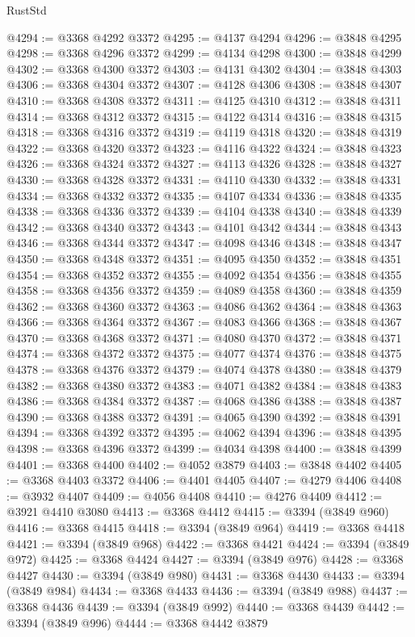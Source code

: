 \begin{lexlean}{RustStd}
\begin{coremodule}
@4294 := @3368 @4292 @3372
@4295 := @4137 @4294
@4296 := @3848 @4295
@4298 := @3368 @4296 @3372
@4299 := @4134 @4298
@4300 := @3848 @4299
@4302 := @3368 @4300 @3372
@4303 := @4131 @4302
@4304 := @3848 @4303
@4306 := @3368 @4304 @3372
@4307 := @4128 @4306
@4308 := @3848 @4307
@4310 := @3368 @4308 @3372
@4311 := @4125 @4310
@4312 := @3848 @4311
@4314 := @3368 @4312 @3372
@4315 := @4122 @4314
@4316 := @3848 @4315
@4318 := @3368 @4316 @3372
@4319 := @4119 @4318
@4320 := @3848 @4319
@4322 := @3368 @4320 @3372
@4323 := @4116 @4322
@4324 := @3848 @4323
@4326 := @3368 @4324 @3372
@4327 := @4113 @4326
@4328 := @3848 @4327
@4330 := @3368 @4328 @3372
@4331 := @4110 @4330
@4332 := @3848 @4331
@4334 := @3368 @4332 @3372
@4335 := @4107 @4334
@4336 := @3848 @4335
@4338 := @3368 @4336 @3372
@4339 := @4104 @4338
@4340 := @3848 @4339
@4342 := @3368 @4340 @3372
@4343 := @4101 @4342
@4344 := @3848 @4343
@4346 := @3368 @4344 @3372
@4347 := @4098 @4346
@4348 := @3848 @4347
@4350 := @3368 @4348 @3372
@4351 := @4095 @4350
@4352 := @3848 @4351
@4354 := @3368 @4352 @3372
@4355 := @4092 @4354
@4356 := @3848 @4355
@4358 := @3368 @4356 @3372
@4359 := @4089 @4358
@4360 := @3848 @4359
@4362 := @3368 @4360 @3372
@4363 := @4086 @4362
@4364 := @3848 @4363
@4366 := @3368 @4364 @3372
@4367 := @4083 @4366
@4368 := @3848 @4367
@4370 := @3368 @4368 @3372
@4371 := @4080 @4370
@4372 := @3848 @4371
@4374 := @3368 @4372 @3372
@4375 := @4077 @4374
@4376 := @3848 @4375
@4378 := @3368 @4376 @3372
@4379 := @4074 @4378
@4380 := @3848 @4379
@4382 := @3368 @4380 @3372
@4383 := @4071 @4382
@4384 := @3848 @4383
@4386 := @3368 @4384 @3372
@4387 := @4068 @4386
@4388 := @3848 @4387
@4390 := @3368 @4388 @3372
@4391 := @4065 @4390
@4392 := @3848 @4391
@4394 := @3368 @4392 @3372
@4395 := @4062 @4394
@4396 := @3848 @4395
@4398 := @3368 @4396 @3372
@4399 := @4034 @4398
@4400 := @3848 @4399
@4401 := @3368 @4400
@4402 := @4052 @3879
@4403 := @3848 @4402
@4405 := @3368 @4403 @3372
@4406 := @4401 @4405
@4407 := @4279 @4406
@4408 := @3932 @4407
@4409 := @4056 @4408
@4410 := @4276 @4409
@4412 := @3921 @4410 @3080
@4413 := @3368 @4412
@4415 := @3394 (@3849 @960)
@4416 := @3368 @4415
@4418 := @3394 (@3849 @964)
@4419 := @3368 @4418
@4421 := @3394 (@3849 @968)
@4422 := @3368 @4421
@4424 := @3394 (@3849 @972)
@4425 := @3368 @4424
@4427 := @3394 (@3849 @976)
@4428 := @3368 @4427
@4430 := @3394 (@3849 @980)
@4431 := @3368 @4430
@4433 := @3394 (@3849 @984)
@4434 := @3368 @4433
@4436 := @3394 (@3849 @988)
@4437 := @3368 @4436
@4439 := @3394 (@3849 @992)
@4440 := @3368 @4439
@4442 := @3394 (@3849 @996)
@4444 := @3368 @4442 @3879

\end{coremodule}
\end{lexlean}

